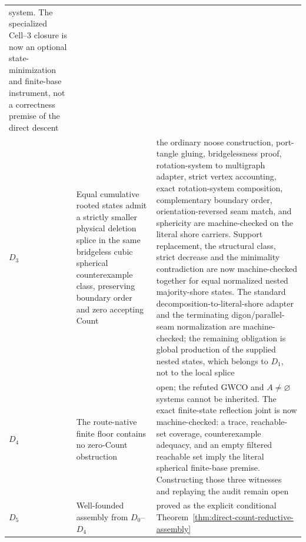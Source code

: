 \begin{center}
\begin{tabular}{@{}p{}p{}p{}@{}}
system.  The
specialized Cell--3 closure is now an optional state-minimization and
finite-base instrument, not a correctness premise of the direct descent \\
$D_3$ & Equal cumulative rooted states admit a strictly smaller physical
deletion splice in the same bridgeless cubic spherical counterexample class,
preserving boundary order and zero accepting Count & the ordinary noose
construction, port-tangle gluing, bridgelessness proof, rotation-system to
multigraph adapter, strict vertex accounting, exact rotation-system
composition, complementary boundary order, orientation-reversed seam match,
and sphericity are machine-checked on the literal shore carriers.  Support
replacement, the structural class, strict decrease and the minimality
contradiction are now machine-checked together for equal normalized nested
majority-shore states.  The standard decomposition-to-literal-shore adapter
and the terminating digon/parallel-seam normalization are machine-checked;
the remaining obligation is global production of the supplied nested states,
which belongs to $D_1$, not to the local splice \\
$D_4$ & The route-native finite floor contains no zero-Count obstruction &
open; the refuted GWCO and $A\ne\varnothing$ systems cannot be inherited.
The exact finite-state reflection joint is now machine-checked: a trace,
reachable-set coverage, counterexample adequacy, and an empty filtered
reachable set imply the literal spherical finite-base premise.  Constructing
those three witnesses and replaying the audit remain open \\
$D_5$ & Well-founded assembly from $D_0$--$D_4$ & proved as the explicit
conditional Theorem~\ref{thm:direct-count-reductive-assembly} \\
\bottomrule
\end{tabular}
\end{center}


